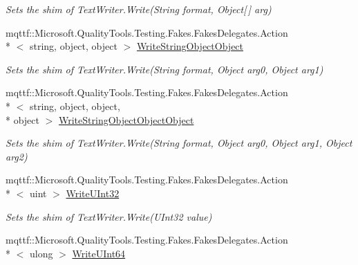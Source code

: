 \begin{DoxyCompactItemize}
\begin{DoxyCompactList}\small\item\em Sets the shim of Text\-Writer.\-Write(\-String format, Object\mbox{[}$\,$\mbox{]} arg)\end{DoxyCompactList}\item 
mqttf\-::\-Microsoft.\-Quality\-Tools.\-Testing.\-Fakes.\-Fakes\-Delegates.\-Action\\*
$<$ string, object, object $>$ \hyperlink{class_system_1_1_i_o_1_1_fakes_1_1_shim_text_writer_a6c51199dd05b4928133325d992a4c93c}{Write\-String\-Object\-Object}
\begin{DoxyCompactList}\small\item\em Sets the shim of Text\-Writer.\-Write(\-String format, Object arg0, Object arg1)\end{DoxyCompactList}\item 
mqttf\-::\-Microsoft.\-Quality\-Tools.\-Testing.\-Fakes.\-Fakes\-Delegates.\-Action\\*
$<$ string, object, object, \\*
object $>$ \hyperlink{class_system_1_1_i_o_1_1_fakes_1_1_shim_text_writer_a964c9183704aa44aa37c75f0140e3214}{Write\-String\-Object\-Object\-Object}
\begin{DoxyCompactList}\small\item\em Sets the shim of Text\-Writer.\-Write(\-String format, Object arg0, Object arg1, Object arg2)\end{DoxyCompactList}\item 
mqttf\-::\-Microsoft.\-Quality\-Tools.\-Testing.\-Fakes.\-Fakes\-Delegates.\-Action\\*
$<$ uint $>$ \hyperlink{class_system_1_1_i_o_1_1_fakes_1_1_shim_text_writer_ae3e8aaa0dde5d99d484fd8321f95a942}{Write\-U\-Int32}
\begin{DoxyCompactList}\small\item\em Sets the shim of Text\-Writer.\-Write(\-U\-Int32 value)\end{DoxyCompactList}\item 
mqttf\-::\-Microsoft.\-Quality\-Tools.\-Testing.\-Fakes.\-Fakes\-Delegates.\-Action\\*
$<$ ulong $>$ \hyperlink{class_system_1_1_i_o_1_1_fakes_1_1_shim_text_writer_ae4ffa8760a7efa387730cf257e0a41ff}{Write\-U\-Int64}

\end{DoxyCompactItemize}
